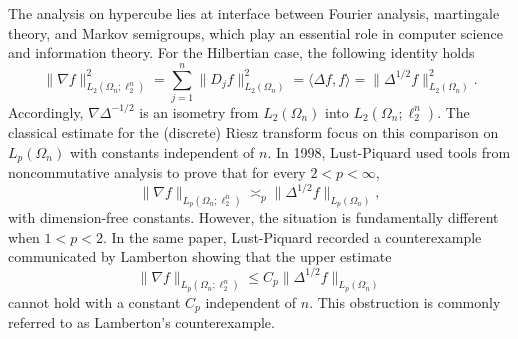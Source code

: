 \documentclass{amsart}
\numberwithin{equation}{section}
\theoremstyle{definition}
\theoremstyle{remark}
\newcommand{\1}{\mathbf 1}
\begin{document}
The analysis on hypercube lies at interface between Fourier analysis, martingale theory, and Markov semigroups, which play an essential role in computer science and information theory. For the Hilbertian case, the following identity holds
\begin{equation}\label{eq:intro-energy}
 \|\nabla f\|_{L_{2}(\Omega_{n};\ell_{2}^{n})}^{2}
 =\sum_{j=1}^{n}\|D_{j}f\|_{L_{2}(\Omega_{n})}^{2}
 =\langle\Delta f,f\rangle
 =\|\Delta^{1/2}f\|_{L_{2}(\Omega_{n})}^{2}.
\end{equation}
Accordingly, $\nabla\Delta^{-1/2}$ is an isometry from $L_{2}(\Omega_{n})$ into $L_{2}(\Omega_{n};\ell_{2}^{n})$.  The classical estimate for the (discrete) Riesz transform focus on this comparison on $L_{p}(\Omega_{n})$ with constants independent of $n$. In 1998, Lust-Piquard \cite{LustPiquard1998} used tools from noncommutative analysis to prove that for every $2<p<\infty$, 
\begin{equation}\label{eq:classical-upper-riesz} 
\|\nabla f\|_{L_{p}(\Omega_{n};\ell_{2}^{n})} \asymp_{p} \|\Delta^{1/2}f\|_{L_{p}(\Omega_{n})}, 
\end{equation} 
with dimension-free constants. However, the situation is fundamentally different when $1<p<2$. In the same paper, Lust-Piquard recorded a counterexample communicated by Lamberton showing that the upper estimate
\begin{equation}\label{eq:failed-half-power-riesz}
\|\nabla f\|_{L_{p}(\Omega_{n};\ell_{2}^{n})} \leq C_{p}\|\Delta^{1/2}f\|_{L_{p}(\Omega_{n})}
\end{equation}
cannot hold with a constant $C_{p}$ independent of $n$. This obstruction is commonly referred to as Lamberton's counterexample.
\end{document}
